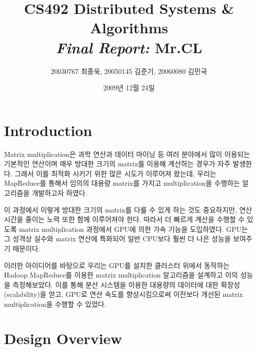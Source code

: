 \documentclass[a4paper]{article}
\begin{document}
\title{CS492 Distributed Systems \& Algorithms\\ \textit{Final Report:} \textbf{Mr.CL}}
\author{20030767 최종욱, 20050145 김준기, 20060080 김민국}
\date{2009년 12월 24일}
\vspace{-40pt}
\maketitle

\begin{multicols}{2}
\section{Introduction}
Matrix multiplication은 과학 연산과 데이터 마이닝 등 여러 분야에서 많이 이용되는 기본적인 연산이며 매우 방대한 크기의 matrix를 이용해 계산하는 경우가 자주 발생한다.
그래서 이를 최적화 시키기 위한 많은 시도가 이루어져 왔는데, 우리는 MapReduce를 통해서 임의의 대용량 matrix를 가지고 multiplication을 수행하는 알고리즘을 개발하고자 하였다.

이 과정에서 이렇게 방대한 크기의 matrix를 다룰 수 있게 하는 것도 중요하지만, 연산 시간을 줄이는 노력 또한 함께 이루어져야 한다.
따라서 더 빠르게 계산을 수행할 수 있도록 matrix multiplication 과정에서 GPU에 의한 가속 기능을 도입하였다.
GPU는 그 성격상 실수와 matrix 연산에 특화되어 일반 CPU보다 훨씬 더 나은 성능을 보여주기 때문이다.

이러한 아이디어를 바탕으로 우리는 GPU를 설치한 클러스터 위에서 동작하는 Hadoop MapReduce를 이용한 matrix multiplication 알고리즘을 설계하고 이의 성능을 측정해보았다.
이를 통해 분산 시스템을 이용한 대용량의 데이터에 대한 확장성(scalability)을 얻고, GPU로 연산 속도를 향상시킴으로써 이전보다 개선된 matrix multiplication을 수행할 수 있었다.

\section{Design Overview}

\end{multicols}
\end{document}
